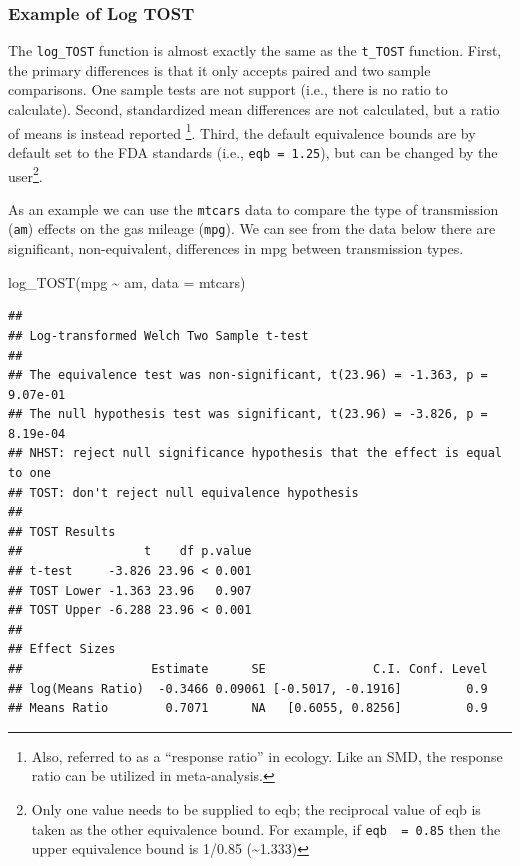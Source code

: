 \documentclass[]{interact}
\theoremstyle{plain}%
\theoremstyle{definition}
\theoremstyle{remark}
\newenvironment{Shaded}{\begin{snugshade}}{\end{snugshade}}
\newcommand{\AttributeTok}[1]{\textcolor[rgb]{0.77,0.63,0.00}{#1}}
\newcommand{\FunctionTok}[1]{\textcolor[rgb]{0.00,0.00,0.00}{#1}}
\newcommand{\NormalTok}[1]{#1}
\newcommand{\SpecialCharTok}[1]{\textcolor[rgb]{0.00,0.00,0.00}{#1}}
\begin{document}
\hypertarget{example-of-log-tost}{%
\subsubsection{Example of Log TOST}\label{example-of-log-tost}}

The \texttt{log\_TOST} function is almost exactly the same as the
\texttt{t\_TOST} function. First, the primary differences is that it
only accepts paired and two sample comparisons. One sample tests are not
support (i.e., there is no ratio to calculate). Second, standardized
mean differences are not calculated, but a ratio of means is instead
reported \citep{lajeunesse2015bias}\footnote{Also, referred to as a
  ``response ratio'' in ecology. Like an SMD, the response ratio can be
  utilized in meta-analysis.}. Third, the default equivalence bounds are
by default set to the FDA standards (i.e., \texttt{eqb\ =\ 1.25}), but
can be changed by the user\footnote{Only one value needs to be supplied
  to eqb; the reciprocal value of eqb is taken as the other equivalence
  bound. For example, if \texttt{eqb\ \ =\ 0.85} then the upper
  equivalence bound is 1/0.85 (\textasciitilde1.333)}.

As an example we can use the \texttt{mtcars} data to compare the type of
transmission (\texttt{am}) effects on the gas mileage (\texttt{mpg}). We
can see from the data below there are significant, non-equivalent,
differences in mpg between transmission types.

\begin{Shaded}
\begin{Highlighting}[]
\FunctionTok{log\_TOST}\NormalTok{(mpg }\SpecialCharTok{\textasciitilde{}}\NormalTok{ am, }\AttributeTok{data =}\NormalTok{ mtcars)}
\end{Highlighting}
\end{Shaded}

\begin{verbatim}
## 
## Log-transformed Welch Two Sample t-test
## 
## The equivalence test was non-significant, t(23.96) = -1.363, p = 9.07e-01
## The null hypothesis test was significant, t(23.96) = -3.826, p = 8.19e-04
## NHST: reject null significance hypothesis that the effect is equal to one 
## TOST: don't reject null equivalence hypothesis
## 
## TOST Results 
##                 t    df p.value
## t-test     -3.826 23.96 < 0.001
## TOST Lower -1.363 23.96   0.907
## TOST Upper -6.288 23.96 < 0.001
## 
## Effect Sizes 
##                  Estimate      SE               C.I. Conf. Level
## log(Means Ratio)  -0.3466 0.09061 [-0.5017, -0.1916]         0.9
## Means Ratio        0.7071      NA   [0.6055, 0.8256]         0.9
\end{verbatim}
\end{document}
